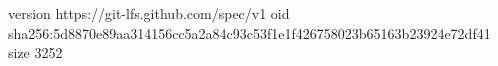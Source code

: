 version https://git-lfs.github.com/spec/v1
oid sha256:5d8870e89aa314156cc5a2a84c93c53f1e1f426758023b65163b23924e72df41
size 3252
